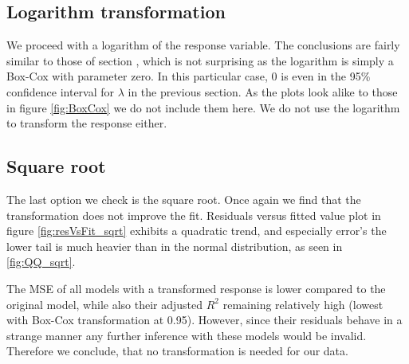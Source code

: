 \documentclass[12pt]{article}
\begin{document}
\subsection{Logarithm transformation}
We proceed with a logarithm of the response variable. The conclusions are fairly similar to those of section \label{boxCoxTrans}, which
is not surprising as the logarithm is simply a Box-Cox with parameter zero.
In this particular case, 0 is even in the 95\% confidence interval for $\lambda$ in the previous section.
As the plots look alike to those in figure \ref{fig:BoxCox}
we do not include them here. We do not use the logarithm to transform the response
either.

\subsection{Square root}
The last option we check is the square root. Once again we find that the transformation does not improve the fit. Residuals versus
fitted value plot in figure \ref{fig:resVsFit_sqrt} exhibits a quadratic trend, and especially error's the lower tail is much heavier
than in the normal distribution, as seen in \ref{fig:QQ_sqrt}.

The MSE of all models with a transformed response is lower compared to the original model, while also their adjusted $R^2$ remaining
relatively high (lowest with Box-Cox transformation at 0.95). However, since their residuals behave in a strange manner any further inference
with these models would be invalid. Therefore we conclude, that no transformation is needed for our data.
\end{document}
